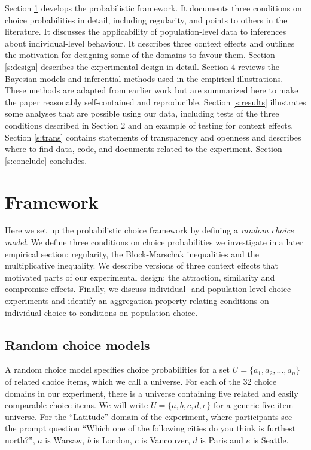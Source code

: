 \documentclass[11pt,letter]{article}
\newcommand{\univ}{U}
\begin{document}
Section \ref{s:framework} develops the probabilistic framework.
It documents three conditions on choice probabilities in detail, including regularity, and points to others in the literature.
It discusses the applicability of population-level data to inferences about individual-level behaviour.
It describes three context effects and outlines the motivation for designing some of the domains to favour them.
Section \ref{s:design} describes the experimental design in detail.
Section 4 reviews the Bayesian models and inferential methods used in the empirical illustrations.
These methods are adapted from earlier work but are summarized here to make the paper reasonably self-contained and reproducible.
Section \ref{s:results} illustrates some analyses that are possible using our data,
including tests of the three conditions described in Section 2 and an example of testing for context effects.
Section \ref{s:trans} contains statements of transparency and openness and describes where to find data, code, and documents related to the experiment.
Section \ref{s:conclude} concludes.

\section{Framework}\label{s:framework}

Here we set up the probabilistic choice framework by defining a {\em random choice model}.
We define three conditions on choice probabilities we investigate in a later empirical section: regularity, the Block-Marschak inequalities and the multiplicative inequality.
We describe versions of three context effects that motivated parts of our experimental design: the attraction, similarity and compromise effects.
Finally, we discuss individual- and population-level choice experiments and identify an aggregation property relating conditions on individual choice to conditions on population choice.

\subsection{Random choice models}

A random choice model specifies choice probabilities for a set $\univ = \{a_1, a_2, \ldots, a_n\}$ of related choice items, which we call a universe.
For each of the 32 choice domains in our experiment, there is a  universe containing five related and easily comparable choice items.
We will write $\univ = \{a,b,c,d,e\}$ for a generic five-item universe.
For the ``Latitude'' domain of the experiment, where participants see the prompt question ``Which one of the following cities do you think is furthest north?'', $a$ is Warsaw, $b$ is London, $c$ is Vancouver, $d$ is Paris and $e$ is Seattle.
\end{document}
